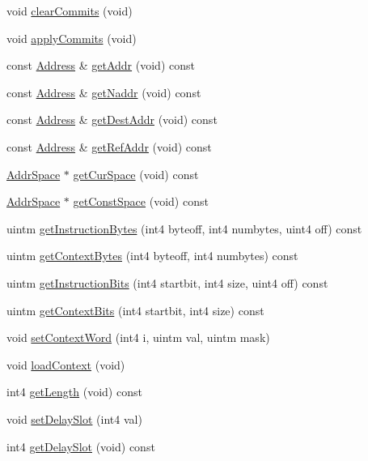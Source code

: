 \begin{DoxyCompactItemize}
\item 
void \mbox{\hyperlink{class_parser_context_ab1b9f2de6217feb73966e15ef89ab4f4}{clear\+Commits}} (void)
\item 
void \mbox{\hyperlink{class_parser_context_aa08843c5d8fb8267069a83120b77bed5}{apply\+Commits}} (void)
\item 
const \mbox{\hyperlink{class_address}{Address}} \& \mbox{\hyperlink{class_parser_context_a6e19b91b26906e6678f1065d9118da05}{get\+Addr}} (void) const
\item 
const \mbox{\hyperlink{class_address}{Address}} \& \mbox{\hyperlink{class_parser_context_aecef32b0b498d6dcb78ca223f2737061}{get\+Naddr}} (void) const
\item 
const \mbox{\hyperlink{class_address}{Address}} \& \mbox{\hyperlink{class_parser_context_a85ee6aa4678230479716fbecb6be31cf}{get\+Dest\+Addr}} (void) const
\item 
const \mbox{\hyperlink{class_address}{Address}} \& \mbox{\hyperlink{class_parser_context_a98d90338dd2a0605dc74a220fa0a1eb7}{get\+Ref\+Addr}} (void) const
\item 
\mbox{\hyperlink{class_addr_space}{Addr\+Space}} $\ast$ \mbox{\hyperlink{class_parser_context_adf3c2cc3d08bbb0da16f307629566942}{get\+Cur\+Space}} (void) const
\item 
\mbox{\hyperlink{class_addr_space}{Addr\+Space}} $\ast$ \mbox{\hyperlink{class_parser_context_a9dd73c7794a457c62b25d733e8825161}{get\+Const\+Space}} (void) const
\item 
uintm \mbox{\hyperlink{class_parser_context_a5112f754f6655d02c1515a6667e9328e}{get\+Instruction\+Bytes}} (int4 byteoff, int4 numbytes, uint4 off) const
\item 
uintm \mbox{\hyperlink{class_parser_context_a9f3ffbc9719247bd2ef63636eff6b0d3}{get\+Context\+Bytes}} (int4 byteoff, int4 numbytes) const
\item 
uintm \mbox{\hyperlink{class_parser_context_abe5d087584325bdb7f435bc2b15da64c}{get\+Instruction\+Bits}} (int4 startbit, int4 size, uint4 off) const
\item 
uintm \mbox{\hyperlink{class_parser_context_aa501230fbe7d667d8453f5ccc8d4f8f0}{get\+Context\+Bits}} (int4 startbit, int4 size) const
\item 
void \mbox{\hyperlink{class_parser_context_a1242790851c096298227efeab13a2df0}{set\+Context\+Word}} (int4 i, uintm val, uintm mask)
\item 
void \mbox{\hyperlink{class_parser_context_af07fe028f5e411bdb414b1683bd4c3b6}{load\+Context}} (void)
\item 
int4 \mbox{\hyperlink{class_parser_context_a9771627b94baf35822436ae402cce979}{get\+Length}} (void) const
\item 
void \mbox{\hyperlink{class_parser_context_a86fae2fe1c96a52c234b8b4533e4687e}{set\+Delay\+Slot}} (int4 val)
\item 
int4 \mbox{\hyperlink{class_parser_context_a8a6526b4b2c1d0ee6cfee2cd5935dcbc}{get\+Delay\+Slot}} (void) const
\end{DoxyCompactItemize}
